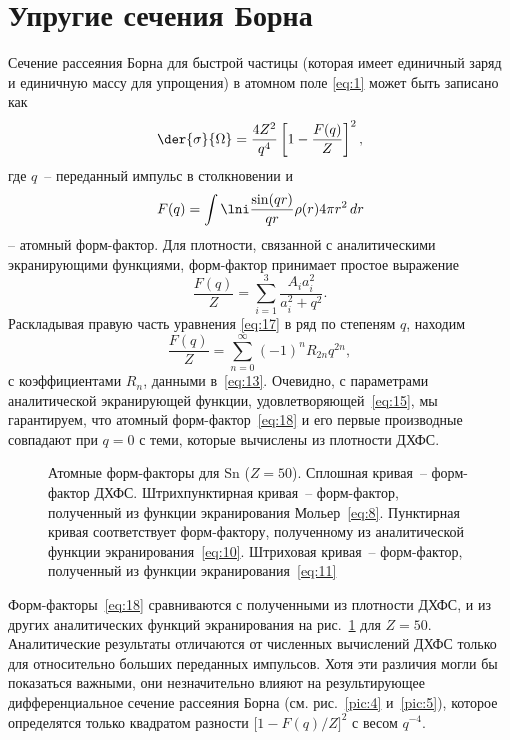 \documentclass[10pt,pscyr]{hedlab}
\newcommand{\eq}  [1]{\eqref{eq:#1}}
\newcommand{\pic} [1]{\ref{pic:#1}}
\begin{document}
  \section{Упругие сечения Борна}
  \label{sec:3}
  
  Сечение рассеяния Борна для быстрой частицы (которая имеет единичный заряд и
  единичную массу для упрощения) в атомном поле \eq{1} может быть записано как
  \begin{equation}
    \der{\sigma}{\Omega} = \frac{4Z^2}{q^4} \left[1 - \frac{F(q)}{Z}\right]^2,
    \label{eq:16}
  \end{equation}
  где \( q \)~-- переданный импульс в столкновении и
  \begin{equation}
    F(q) = \int\lni \frac{\sin(qr)}{qr} \rho(r) 4\pi r^2\,dr
    \label{eq:17}
  \end{equation}
  -- атомный форм-фактор. Для плотности, связанной с аналитическими
  экранирующими функциями, форм-фактор принимает простое выражение
  \begin{equation}
    \frac{F(q)}{Z} = \sum\limits_{i=1}^3 \frac{A_i a_i^2}{a_i^2 + q^2}.
    \label{eq:18}
  \end{equation}
  Раскладывая правую часть уравнения \eq{17} в ряд по степеням \( q \), находим
  \[
    \frac{F(q)}{Z} = \sum\limits_{n=0}^\infty (-1)^n R_{2n} q^{2n},
  \]
  с коэффициентами \( R_n \), данными в~\eq{13}. Очевидно, с параметрами
  аналитической экранирующей функции, удовлетворяющей~\eq{15}, мы гарантируем,
  что атомный форм-фактор~\eq{18} и его первые производные совпадают при
  \( q = 0 \) с теми, которые вычислены из плотности ДХФС.
  
  \begin{figure}[htb!]
    \caption{Атомные форм-факторы для Sn (\( Z = 50 \)). Сплошная кривая~--
      форм-фактор ДХФС. Штрихпунктирная кривая~-- форм-фактор, полученный из
      функции экранирования Мольер~\eq{8}. Пунктирная кривая соответствует
      форм-фактору, полученному из аналитической функции экранирования~\eq{10}.
      Штриховая кривая~-- форм-фактор, полученный из функции
      экранирования~\eq{11}}
    \label{pic:3}
  \end{figure}
  
  Форм-факторы~\eq{18} сравниваются с полученными из плотности ДХФС, и из
  других аналитических функций экранирования на рис.~\pic{3} для \( Z = 50 \).
  Аналитические результаты отличаются от численных вычислений ДХФС только для
  относительно больших переданных импульсов. Хотя эти различия могли бы
  показаться важными, они незначительно влияют на результирующее
  дифференциальное сечение рассеяния Борна (см. рис.~\pic{4} и~\pic{5}),
  которое определятся только квадратом разности
  \( \bigl[1 - F(q) / Z\big]^2 \) с весом \( q^{-4} \).
  
\end{document}
